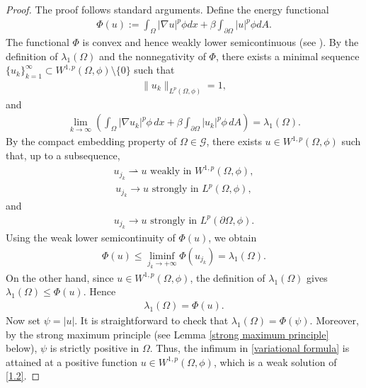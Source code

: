 \documentclass[11pt,leqno]{amsart}
\def\l{\lambda}
\numberwithin{equation}{section}
\begin{document}
\begin{proof}
    The proof follows standard arguments. 
Define the energy functional
\begin{align*}
    \Phi (u):=\int_{\Omega}|\nabla u|^{p}\phi dx+\beta\int_{\partial \Omega}|u|^{p}\phi dA.
\end{align*}
The functional $\Phi$ is  convex and hence weakly lower semicontinuous (see \cite{Evans}).
By the definition of $\lambda_1(\Omega)$ and the nonnegativity of $\Phi$, there exists a minimal sequence $\{u_k\}_{k=1}^{\infty}\subset  W^{1,p}(\Omega,\phi )\setminus\{0\}$ such that 
\begin{align*}    
\|u_k\|_{L^p(\Omega,\phi )}=1,
\end{align*} 
and 
\begin{align*}
    \lim\limits_{k\rightarrow \infty}\left(\int_{\Omega}|\nabla u_{k}|^p\phi \,dx+\beta\int_{\partial\Omega}|u_{k}|^p\phi \,dA\right)=\lambda_1(\Omega).
\end{align*} 
By the compact embedding property of $\Omega\in \mathcal{G}$, there exists $u\in W^{1,p}(\Omega,\phi )$ such that, up to a subsequence,  
\begin{align*}
u_{j_{k}} \rightharpoonup u \text{ weakly in } W^{1,p}(\Omega,\phi ),
\end{align*}
\begin{align*}
u_{j_{k}} \to u \text{ strongly in } L^p(\Omega,\phi ),
\end{align*}
and 
\begin{align*}
u_{j_{k}}\rightarrow u \text{ strongly in } L^p(\partial\Omega,\phi ).
\end{align*}
Using the weak lower semicontinuity of $\Phi (u)$, we obtain
\begin{align*}
\Phi (u) \leq \liminf_{j_k\to+\infty} \Phi (u_{j_k}) = \lambda_1(\Omega).
\end{align*}
On the other hand, since $u\in W^{1, p}(\Omega, \phi)$, the definition of $\l_1(\Omega)$ gives $\lambda_1(\Omega) \leq \Phi (u)$. Hence
\begin{align*}
\lambda_1(\Omega) = \Phi (u).
\end{align*}
Now set $\psi = |u|$. It is straightforward to check that  $\lambda_1(\Omega) = \Phi (\psi)$. Moreover, by the strong maximum principle (see Lemma \ref{strong maximum principle} below), $\psi$ is strictly positive  in $\Omega$. Thus, the infimum in \eqref{variational formula} is attained at a positive function $u\in W^{1,p}(\Omega,\phi )$, which is a weak solution of \eqref{1.2}.



\end{proof}
\end{document}
